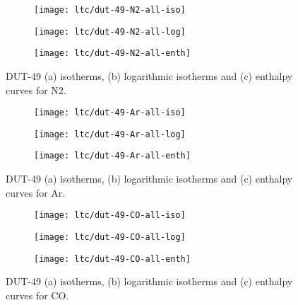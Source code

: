 \begin{figure}[htb]
    \centering
    \begin{subfigure}{0.33\linewidth}
        \texttt{[image: ltc/dut-49-N2-all-iso]}%
        \caption{}
    \end{subfigure}%
    \begin{subfigure}{0.33\linewidth}
        \texttt{[image: ltc/dut-49-N2-all-log]}%
        \caption{}
    \end{subfigure}%
    \begin{subfigure}{0.33\linewidth}
        \texttt{[image: ltc/dut-49-N2-all-enth]}%
        \caption{}
    \end{subfigure}%
    \caption{DUT-49 (a) isotherms, (b) logarithmic isotherms and 
    (c) enthalpy curves for N2.}%
    \label{appx:dut:fig:dut-49-N2-ltc}
\end{figure}

\begin{figure}[htb]
    \centering
    \begin{subfigure}{0.33\linewidth}
        \texttt{[image: ltc/dut-49-Ar-all-iso]}%
        \caption{}
    \end{subfigure}%
    \begin{subfigure}{0.33\linewidth}
        \texttt{[image: ltc/dut-49-Ar-all-log]}%
        \caption{}
    \end{subfigure}%
    \begin{subfigure}{0.33\linewidth}
        \texttt{[image: ltc/dut-49-Ar-all-enth]}%
        \caption{}
    \end{subfigure}%
    \caption{DUT-49 (a) isotherms, (b) logarithmic isotherms and 
    (c) enthalpy curves for Ar.}%
    \label{appx:dut:fig:dut-49-Ar-ltc}
\end{figure}

\begin{figure}[htb]
    \centering
    \begin{subfigure}{0.33\linewidth}
        \texttt{[image: ltc/dut-49-CO-all-iso]}%
        \caption{}
    \end{subfigure}%
    \begin{subfigure}{0.33\linewidth}
        \texttt{[image: ltc/dut-49-CO-all-log]}%
        \caption{}
    \end{subfigure}%
    \begin{subfigure}{0.33\linewidth}
        \texttt{[image: ltc/dut-49-CO-all-enth]}%
        \caption{}
    \end{subfigure}%
    \caption{DUT-49 (a) isotherms, (b) logarithmic isotherms and 
    (c) enthalpy curves for CO.}%
    \label{appx:dut:fig:dut-49-CO-ltc}
\end{figure}

